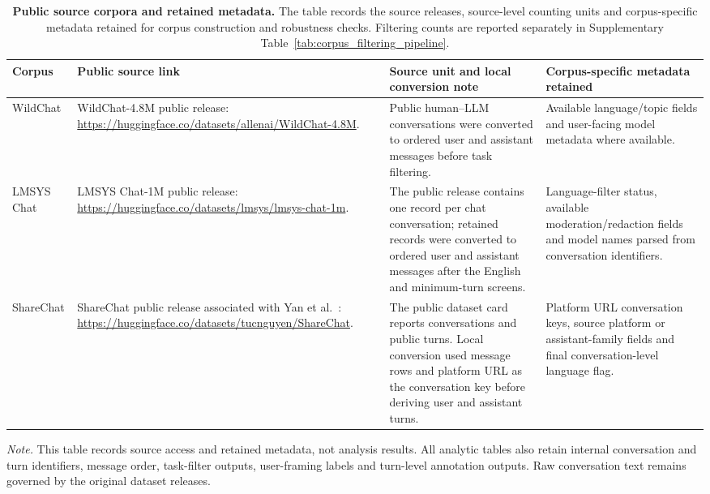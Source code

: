 \begin{table}[!htbp]
\centering
\caption{\textbf{Public source corpora and retained metadata.} The table records the source releases, source-level counting units and corpus-specific metadata retained for corpus construction and robustness checks. Filtering counts are reported separately in Supplementary Table~\ref{tab:corpus_filtering_pipeline}.}
\label{tab:corpus_provenance_artifacts}
\fontsize{7.4pt}{8.5pt}\selectfont
\setlength{\tabcolsep}{3pt}
\renewcommand{\arraystretch}{1.15}
\begin{tabularx}{\textwidth}{>{\raggedright\arraybackslash}p{}>{\raggedright\arraybackslash}p{}>{\raggedright\arraybackslash}p{}>{\raggedright\arraybackslash}X}
\toprule
Corpus & Public source link & Source unit and local conversion note & Corpus-specific metadata retained \\
\midrule
WildChat & WildChat-4.8M public release: \url{https://huggingface.co/datasets/allenai/WildChat-4.8M}. & Public human--LLM conversations were converted to ordered user and assistant messages before task filtering. & Available language/topic fields and user-facing model metadata where available. \\
\addlinespace
LMSYS Chat & LMSYS Chat-1M public release: \url{https://huggingface.co/datasets/lmsys/lmsys-chat-1m}. & The public release contains one record per chat conversation; retained records were converted to ordered user and assistant messages after the English and minimum-turn screens. & Language-filter status, available moderation/redaction fields and model names parsed from conversation identifiers. \\
\addlinespace
ShareChat & ShareChat public release associated with Yan et al.~\cite{yan2025sharechat}: \url{https://huggingface.co/datasets/tucnguyen/ShareChat}. & The public dataset card reports conversations and public turns. Local conversion used message rows and platform URL as the conversation key before deriving user and assistant turns. & Platform URL conversation keys, source platform or assistant-family fields and final conversation-level language flag. \\
\bottomrule
\end{tabularx}

\vspace{1mm}
\begin{minipage}{0.94\textwidth}
\footnotesize
\textit{Note.} This table records source access and retained metadata, not analysis results. All analytic tables also retain internal conversation and turn identifiers, message order, task-filter outputs, user-framing labels and turn-level annotation outputs. Raw conversation text remains governed by the original dataset releases.
\end{minipage}
\end{table}
